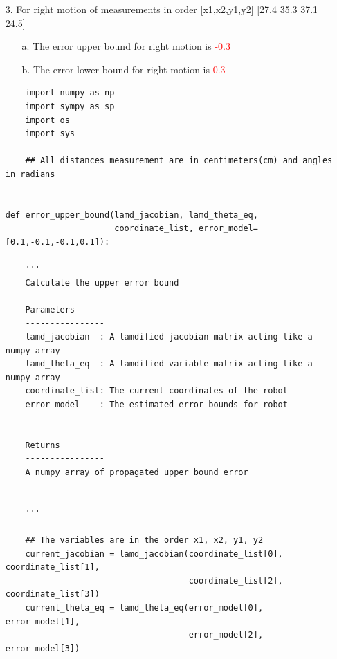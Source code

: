 {\begin{itemize}
        \begin{itemize}
            \item[a.] The error upper bound for left motion is \textcolor{red}{1.1 \textdegree} 
            \item[b.] The error lower bound for left motion is \textcolor{red}{-1.1 \textdegree }
        \end{itemize}

        \item[3.] For right motion of measurements in order [x1,x2,y1,y2] [27.4 35.3 37.1 24.5]
        
        \begin{itemize}
            \item[a.] The error upper bound for right motion is \textcolor{red}{-0.3 \textdegree }
            \item[b.] The error lower bound for right motion is \textcolor{red}{0.3 \textdegree }
        \end{itemize}


            
        \begin{verbatim}
    import numpy as np
    import sympy as sp
    import os
    import sys
    
    ## All distances measurement are in centimeters(cm) and angles in radians 


def error_upper_bound(lamd_jacobian, lamd_theta_eq, 
                      coordinate_list, error_model=[0.1,-0.1,-0.1,0.1]):
    
    '''
    Calculate the upper error bound
    
    Parameters
    ----------------
    lamd_jacobian  : A lamdified jacobian matrix acting like a numpy array
    lamd_theta_eq  : A lamdified variable matrix acting like a numpy array
    coordinate_list: The current coordinates of the robot
    error_model    : The estimated error bounds for robot
    
    
    Returns
    ----------------
    A numpy array of propagated upper bound error
    
    
    '''
    
    ## The variables are in the order x1, x2, y1, y2
    current_jacobian = lamd_jacobian(coordinate_list[0], coordinate_list[1],
                                     coordinate_list[2], coordinate_list[3])
    current_theta_eq = lamd_theta_eq(error_model[0], error_model[1], 
                                     error_model[2], error_model[3])
    

\end{verbatim}
\end{itemize}}
